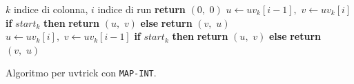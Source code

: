 \begin{algorithm}
  \small
  \begin{algorithmic}[1]
    \Comment $k$ indice di colonna, $i$ indice di run
    \State \textbf{return} $(0,\,\,0)$
    \State $u\gets uv_k[i-1],\,\,v\gets uv_k[i]$
    \State \textbf{if} $start_k$ \textbf{then} \textbf{return} $(u,\,\,v)$
    \textbf{else} 
    \textbf{return} $(v,\,\,u)$
    \Else
    \State $u\gets uv_k[i],\,\,v\gets uv_k[i-1]$
    \State \textbf{if} $start_k$ \textbf{then} \textbf{return} $(u,\,\,v)$
    \textbf{else} 
    \textbf{return} $(v,\,\,u)$
    \EndIf
    \EndFunction
  \end{algorithmic}
  \caption{Algoritmo per uvtrick con \texttt{MAP-INT}.}
  \label{algo:uvnaive}
\end{algorithm}


